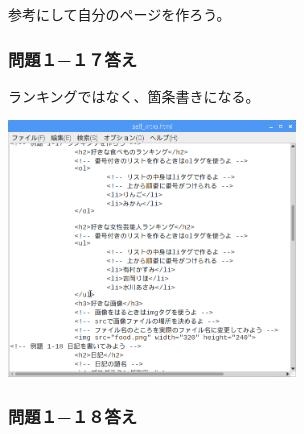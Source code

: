 \documentclass[a4paper,12pt]{jarticle}
\begin{document}
参考にして自分のページを作ろう。

\subsubsection{\bfseries
  問題１−１７答え}

ランキングではなく、箇条書きになる。

\centering
\includegraphics[width=7.622cm,height=6.8cm]{textbook-img236.png}
\flushleft

\bigskip

\subsubsection{\bfseries
  問題１−１８答え}
\end{document}
